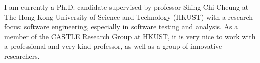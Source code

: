%
%
%
\par{
	I am currently a Ph.D. candidate supervised by professor Shing-Chi Cheung at The Hong Kong University of Science and Technology (HKUST) with a research focus: software engineering, especially in software testing and analysis.
	As a member of the CASTLE Research Group at HKUST, it is very nice to work with a professional and very kind professor, as well as a group of innovative researchers.
}